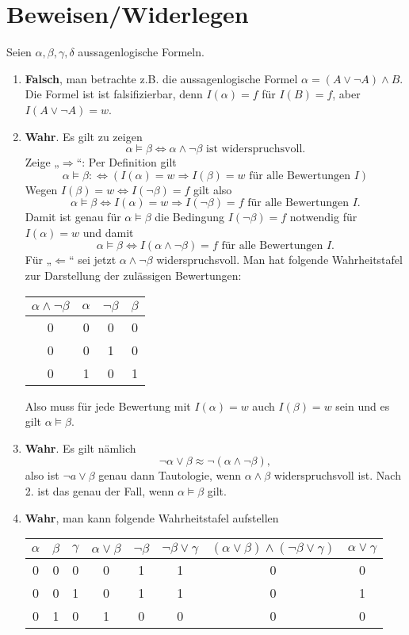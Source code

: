 \documentclass[a4paper]{article}
\begin{document}
\section{Beweisen/Widerlegen}
Seien $α,β, γ,δ$ aussagenlogische Formeln. 
\begin{enumerate}
\item \textbf{Falsch}, man betrachte z.B. die aussagenlogische Formel $α = ( A\vee \neg A) \wedge B$.
Die Formel ist ist falsifizierbar, denn $I(α) = f$ für $I(B) = f$, aber $I(A\vee\neg A) = w$.
\item \textbf{Wahr}. Es gilt zu zeigen
$$α \vDash β ⇔ α\wedge \neg β \text{ ist widerspruchsvoll.}$$
Zeige „$\Rightarrow$“: Per Definition gilt
$$α\vDash β :⇔ \left( I(α) = w \Rightarrow I(β) = w \text{ für alle Bewertungen $I$}\right)$$ 
Wegen $I(β) = w ⇔ I(\neg β) = f$ gilt also
$$α\vDash β ⇔ I(α) = w \Rightarrow I(\neg β) = f \text{ für alle Bewertungen $I$}.$$
Damit ist genau für $α\vDash β$ die Bedingung $I(\neg β) = f$ notwendig für $I(α) = w$ und damit 
$$α\vDash β ⇔ I(α\wedge \neg β ) = f \text{ für alle Bewertungen $I$.}$$
Für „$\Leftarrow$“ sei jetzt $α\wedge \neg β$ widerspruchsvoll. Man hat folgende Wahrheitstafel zur Darstellung der zulässigen Bewertungen:
\begin{center}
\begin{tabular}{c|c|c|c}
$α\wedge \neg β$ & $α$ & $\neg β$ & $β$ \\ \hline
0 & 0 & 0 & 0\\
0 & 0 & 1 & 0\\
0 & 1 & 0 & 1
\end{tabular}
\end{center}
Also muss für jede Bewertung mit $I(α) = w$ auch $I(β) = w$ sein und es gilt $α\vDash β$.
\item \textbf{Wahr}. Es gilt nämlich 
$$\neg α \vee β \approx \neg (α\wedge \neg β),$$
also ist $\neg a \vee β$ genau dann Tautologie, wenn $α\wedge β$ widerspruchsvoll ist. 
Nach 2. ist das genau der Fall, wenn $α\vDash β$ gilt.
\item \textbf{Wahr}, man kann folgende Wahrheitstafel aufstellen
\begin{center}
\begin{tabular}{c|c|c|c|c|c|c|c}
$α$ & $β$ & $γ$ & $α\vee β$ & $\neg β$ & $\neg β \vee γ$ & $(α\vee β)\wedge ( \neg β \vee γ )$ & $α\vee γ$\\\hline
0&0&0&0&1&1&0&0\\
0&0&1&0&1&1&0&1\\
0&1&0&1&0&0&0&0\\

\end{tabular}
\end{center}
\end{enumerate}
\end{document}
